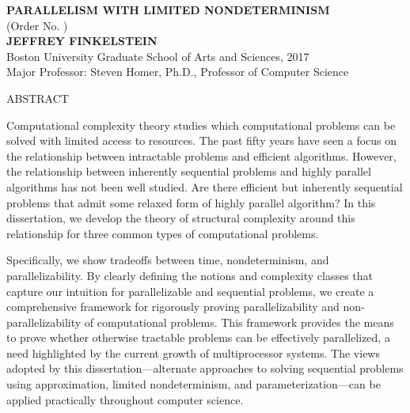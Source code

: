 \newenvironment{abstractpage}
  {\thispagestyle{plain}}
  {}

\begin{abstractpage}
  \begin{center}
    \textbf{\uppercase{Parallelism with limited nondeterminism}} \\
    (Order No. \phantom{1234567890}) \\
    \textbf{\uppercase{Jeffrey Finkelstein}} \\
    Boston University Graduate School of Arts and Sciences, 2017 \\
    Major Professor: Steven Homer, Ph.D., Professor of Computer Science
  \end{center}
  \begin{center}
    ABSTRACT
  \end{center}
  Computational complexity theory studies which computational problems can be solved with limited access to resources.
  The past fifty years have seen a focus on the relationship between intractable problems and efficient algorithms.
  However, the relationship between inherently sequential problems and highly parallel algorithms has not been well studied.
  Are there efficient but inherently sequential problems that admit some relaxed form of highly parallel algorithm?
  In this dissertation, we develop the theory of structural complexity around this relationship for three common types of computational problems.

  Specifically, we show tradeoffs between time, nondeterminism, and parallelizability.
  By clearly defining the notions and complexity classes that capture our intuition for parallelizable and sequential problems, we create a comprehensive framework for rigorously proving parallelizability and non-parallelizability of computational problems.
  This framework provides the means to prove whether otherwise tractable problems can be effectively parallelized, a need highlighted by the current growth of multiprocessor systems.
  The views adopted by this dissertation---alternate approaches to solving sequential problems using approximation, limited nondeterminism, and parameterization---can be applied practically throughout computer science.
\end{abstractpage}
